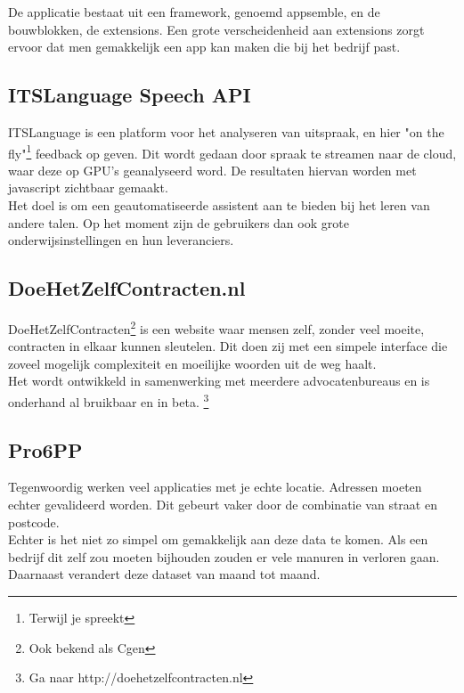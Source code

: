De applicatie bestaat uit een framework, genoemd appsemble, en de bouwblokken, de extensions. Een grote verscheidenheid aan extensions zorgt ervoor dat men gemakkelijk een app kan maken die bij het bedrijf past.

\subsection{ITSLanguage Speech API}

ITSLanguage is een platform voor het analyseren van uitspraak, en hier "on the fly"\footnote{Terwijl je spreekt} feedback op geven. Dit wordt gedaan door spraak te streamen naar de cloud, waar deze op GPU's geanalyseerd word. De resultaten hiervan worden met javascript zichtbaar gemaakt. \\

Het doel is om een geautomatiseerde assistent aan te bieden  bij het leren van andere talen. Op het moment zijn de gebruikers dan  ook grote onderwijsinstellingen en hun leveranciers.

\subsection{DoeHetZelfContracten.nl}

DoeHetZelfContracten\footnote{Ook bekend als Cgen} is een website waar mensen zelf, zonder veel moeite, contracten in elkaar kunnen sleutelen. Dit doen zij met een simpele interface die zoveel mogelijk complexiteit en moeilijke woorden uit de weg haalt. \\

Het wordt ontwikkeld in samenwerking met meerdere advocatenbureaus en is onderhand al bruikbaar en in beta. \footnote{Ga naar http://doehetzelfcontracten.nl}

\subsection{Pro6PP}

Tegenwoordig werken veel applicaties met je echte locatie. Adressen moeten echter gevalideerd worden. Dit gebeurt vaker door de combinatie van straat en postcode. \\

Echter is het niet zo simpel om gemakkelijk aan deze data te komen. Als een bedrijf dit zelf zou moeten bijhouden zouden er vele manuren in verloren gaan. Daarnaast verandert deze dataset van maand tot maand. \\

